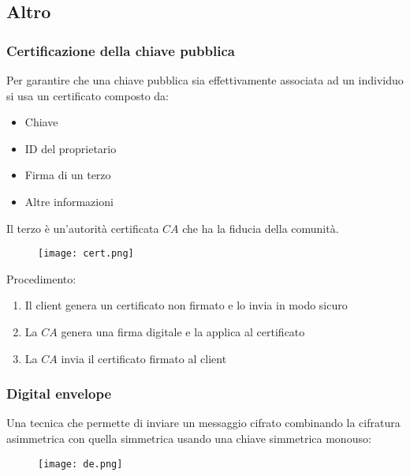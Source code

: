 \documentclass{article}
\begin{document}
\subsection{Altro}

\subsubsection{Certificazione della chiave pubblica}

Per garantire che una chiave pubblica sia effettivamente associata ad un individuo si usa un certificato composto da:
\begin{itemize}
    \item Chiave 
    \item ID del proprietario
    \item Firma di un terzo
    \item Altre informazioni
\end{itemize}

\noindent Il terzo è un'autorità certificata $CA$ che ha la fiducia della comunità.\newline

\begin{figure}[ht]
    \centering
    \texttt{[image: cert.png]}
\end{figure}

\noindent Procedimento:
\begin{enumerate}
    \item Il client genera un certificato non firmato e lo invia in modo sicuro
    \item La $CA$ genera una firma digitale e la applica al certificato
    \item La $CA$ invia il certificato firmato al client
\end{enumerate}

\newpage

\subsubsection{Digital envelope}

Una tecnica che permette di inviare un messaggio cifrato combinando la cifratura asimmetrica con quella simmetrica usando una chiave simmetrica monouso:

\begin{figure}[ht]
    \centering
    \texttt{[image: de.png]}
\end{figure}
\end{document}
